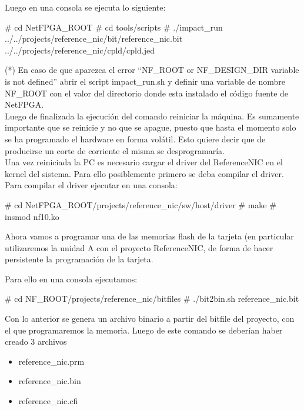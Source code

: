 Luego en una consola se ejecuta lo siguiente:

\begin{bash}
# cd NetFPGA_ROOT
# cd tools/scripts
# ./impact_run 
  ../../projects/reference_nic/bit/reference_nic.bit 
  ../../projects/reference_nic/cpld/cpld.jed 
\end{bash}

(*) En caso de que aparezca el error “NF\_ROOT or NF\_DESIGN\_DIR variable is not defined”
abrir el script impact\_run.sh y definir una variable de nombre NF\_ROOT con el valor del directorio donde esta instalado el código fuente de NetFPGA.\\

Luego de finalizada la ejecución del comando reiniciar la máquina. Es sumamente importante que se reinicie y no que se apague, puesto que hasta el momento solo se ha programado el hardware en forma volátil. Esto quiere decir que de producirse un corte de corriente el misma se desprogramaría.\\

Una vez reiniciada la PC es necesario cargar el driver del ReferenceNIC en el kernel del sistema. Para ello posiblemente primero se deba compilar el driver. Para compilar el driver ejecutar en una consola:\\

\begin{bash}
# cd NetFPGA_ROOT/projects/reference_nic/sw/host/driver
# make
# insmod nf10.ko
\end{bash}

Ahora vamos a programar una de las memorias flash de la tarjeta (en particular utilizaremos la unidad A con el proyecto ReferenceNIC, de forma de hacer persistente la programación de la tarjeta.

Para ello en una consola ejecutamos:

\begin{bash}
# cd NF_ROOT/projects/reference_nic/bitfiles
# ./bit2bin.sh reference_nic.bit
\end{bash}

Con lo anterior se genera un archivo binario a partir del bitfile del proyecto, con el que programaremos la memoria. Luego de este comando se deberían haber creado 3 archivos

\begin{itemize}
\item reference\_nic.prm
\item reference\_nic.bin
\item reference\_nic.cfi
\end{itemize}

